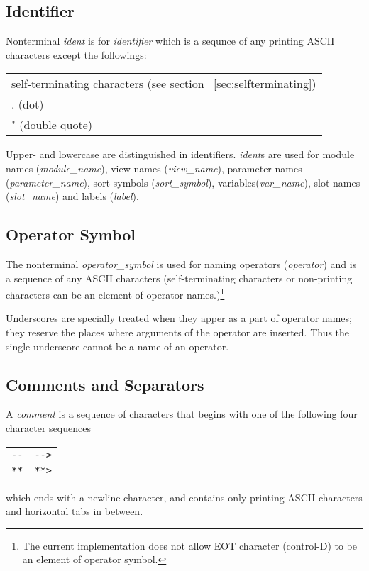 \documentclass[a4paper]{article}
\def\sym#1{\textsf{#1}\null}
\def\nonterm#1{\textit{#1}\null}
\begin{document}
\subsection{Identifier}
\label{sec:identifier}
Nonterminal \nonterm{ident} is for \emph{identifier}
which is a sequnce of any printing ASCII characters except
the followings:
\begin{center}
  \begin{tabular}{l}
    self-terminating characters (see section ~\ref{sec:selfterminating})\\
    \sym{.} (dot)\\
    \sym{"} (double quote)\\
  \end{tabular}
\end{center}
Upper- and lowercase are distinguished in identifiers.
\nonterm{ident}s are used for module names (\nonterm{module\_name}),
view names (\nonterm{view\_name}), 
parameter names (\nonterm{parameter\_name}), 
sort symbols (\nonterm{sort\_symbol}), variables(\nonterm{var\_name}), 
slot names (\nonterm{slot\_name}) and labels (\nonterm{label}).

\subsection{Operator Symbol}
\label{sec:opsymbol}
The nonterminal \nonterm{operator\_symbol} is used for naming operators 
(\nonterm{operator}) and is a sequence of any ASCII characters
(self-terminating characters or non-printing characters can be an
element of operator names.)\footnote{The current implementation does
  not allow EOT character (control-D) to be an element of operator
  symbol. } 

Underscores are specially treated when they apper as a part of
operator names; they reserve the places where arguments of the
operator are inserted. Thus the single underscore cannot be a
name of an operator. 

\subsection{Comments and Separators}
\label{sec:comments}
A \nonterm{comment} is a sequence of characters that begins with one
of the following four character sequences
\begin{center}
  \begin{tabular}{ll}
    \verb|--| &
    \verb|-->|\\
    \verb|**| &
    \verb|**>| \\
  \end{tabular}
\end{center}
which ends with a newline character, and contains only printing ASCII
characters and horizontal tabs in between.
\end{document}
